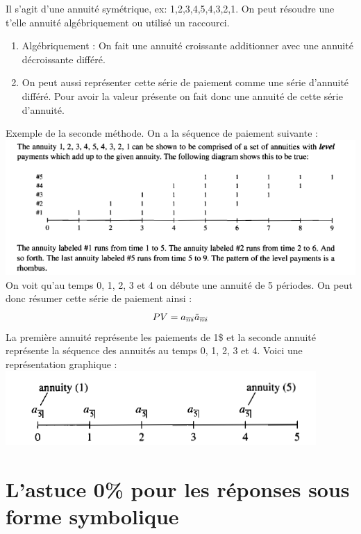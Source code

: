 \documentclass[11pt,french]{report}
\makeatletter
\DeclareRobustCommand{\annuity}[1]{%
\def\arraystretch{0}%
\setlength\arraycolsep{.7pt}%
\setlength\arrayrulewidth{.3pt}%
\begin{array}[b]{@{}c|}\hline
\\[\arraycolsep]%
\scriptstyle #1%
\end{array}%
}
\makeatother
\begin{document}
Il s'agit d'une annuité symétrique, ex: 1,2,3,4,5,4,3,2,1. On peut résoudre une t'elle annuité algébriquement ou utilisé un raccourci.
\begin{enumerate}
\item Algébriquement : On fait une annuité croissante additionner avec une annuité décroissante différé.
\item On peut aussi représenter cette série de paiement comme une série d'annuité différé. Pour avoir la valeur présente on fait donc une annuité de cette série d'annuité.  
\end{enumerate}
Exemple de la seconde méthode. On a la séquence de paiement suivante :\\
\includegraphics[scale=0.59]{picture9.PNG}\\
On voit qu'au temps 0, 1, 2, 3 et 4 on débute une annuité de 5 périodes. On peut donc résumer cette série de paiement ainsi :
\begin{equation}
PV= a_{\annuity{n}i} \ddot{a}_{\annuity{n}i}
\end{equation}
La première annuité représente les paiements de 1\$ et la seconde annuité représente la séquence des annuités au temps 0, 1, 2, 3 et 4. Voici une représentation graphique :
\\
\includegraphics[scale=0.65]{picture10.PNG}

\section{L'astuce 0\% pour les réponses sous forme symbolique}
\label{sec:astuce0}
\end{document}
